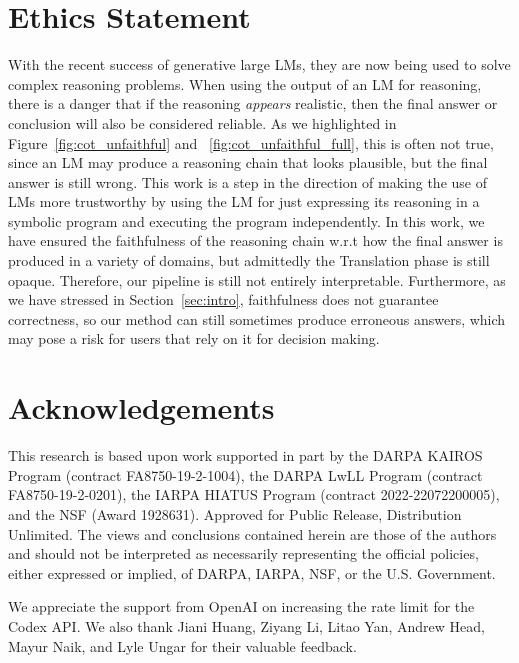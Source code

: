 \documentclass[11pt]{article}
\begin{document}
\section*{Ethics Statement}
With the recent success of generative large LMs, they are now being used to solve complex reasoning problems. When using the output of an LM for reasoning, there is a danger that if the reasoning {\em appears} realistic, then the final answer or conclusion will also be considered reliable. As we highlighted in Figure~\ref{fig:cot_unfaithful} and ~\ref{fig:cot_unfaithful_full}, this is often not true, since an LM may produce a reasoning chain that looks plausible, but the final answer is still wrong. This work is a step in the direction of making the use of LMs more trustworthy by using the LM for just expressing its reasoning in a symbolic program and executing the program independently. In this work, we have ensured the faithfulness of the reasoning chain w.r.t how the final answer is produced in a variety of domains, but admittedly the Translation phase is still opaque. Therefore, our pipeline is still not entirely interpretable. Furthermore, as we have stressed in Section~\ref{sec:intro}, faithfulness does not guarantee correctness, so our method can still sometimes produce erroneous answers, which may pose a risk for users that rely on it for decision making.

\section*{Acknowledgements}
This research is based upon work supported in part by the DARPA KAIROS Program (contract FA8750-19-2-1004), the DARPA LwLL Program (contract FA8750-19-2-0201), the IARPA HIATUS Program (contract 2022-22072200005), and the NSF (Award 1928631). Approved for Public Release, Distribution Unlimited. The views and conclusions contained herein are those of the authors and should not be interpreted as necessarily representing the official policies, either expressed or implied, of DARPA, IARPA, NSF, or the U.S. Government.

We appreciate the support from OpenAI on increasing the rate limit for the Codex API. We also thank Jiani Huang, Ziyang Li, Litao Yan, Andrew Head, Mayur Naik, and Lyle Ungar for their valuable feedback.






\end{document}
